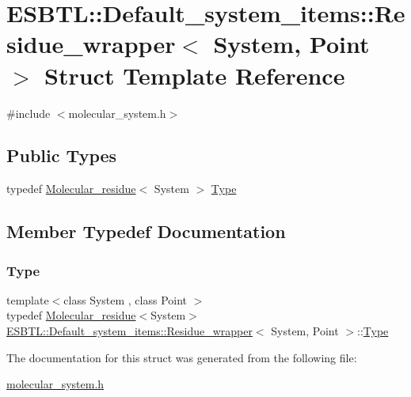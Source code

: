\hypertarget{structESBTL_1_1Default__system__items_1_1Residue__wrapper}{}\section{E\+S\+B\+TL\+:\+:Default\+\_\+system\+\_\+items\+:\+:Residue\+\_\+wrapper$<$ System, Point $>$ Struct Template Reference}
\label{structESBTL_1_1Default__system__items_1_1Residue__wrapper}


{\ttfamily \#include $<$molecular\+\_\+system.\+h$>$}

\subsection*{Public Types}
\begin{DoxyCompactItemize}
\item 
typedef \hyperlink{classESBTL_1_1Molecular__residue}{Molecular\+\_\+residue}$<$ System $>$ \hyperlink{structESBTL_1_1Default__system__items_1_1Residue__wrapper_af66a70577652dd2744b25669f8128c44}{Type}
\end{DoxyCompactItemize}


\subsection{Member Typedef Documentation}
\mbox{\label{structESBTL_1_1Default__system__items_1_1Residue__wrapper_af66a70577652dd2744b25669f8128c44}} 
\subsubsection{\texorpdfstring{Type}{Type}}
{\footnotesize\ttfamily template$<$class System , class Point $>$ \\
typedef \hyperlink{classESBTL_1_1Molecular__residue}{Molecular\+\_\+residue}$<$System$>$ \hyperlink{structESBTL_1_1Default__system__items_1_1Residue__wrapper}{E\+S\+B\+T\+L\+::\+Default\+\_\+system\+\_\+items\+::\+Residue\+\_\+wrapper}$<$ System, Point $>$\+::\hyperlink{structESBTL_1_1Default__system__items_1_1Residue__wrapper_af66a70577652dd2744b25669f8128c44}{Type}}



The documentation for this struct was generated from the following file\+:\begin{DoxyCompactItemize}
\item 
\hyperlink{molecular__system_8h}{molecular\+\_\+system.\+h}\end{DoxyCompactItemize}
